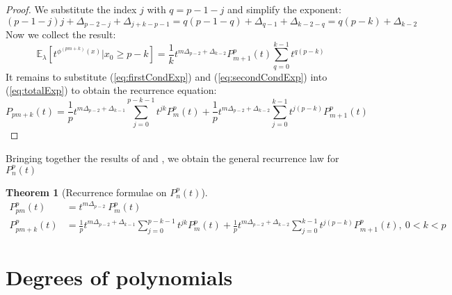 \documentclass[a4paper]{article}
\theoremstyle{plain}
\newtheorem{theorem}{Theorem}[section]
\theoremstyle{definition}
\begin{document}
\begin{proof}
We substitute the index $j$ with $q = p-1-j$ and simplify the exponent:
$$  (p-1-j) j + \Delta_{p-2-j} + \Delta_{j+k-p-1} =
    q(p-1-q) + \Delta_{q-1} + \Delta_{k-2-q}=
   q(p-k)+\Delta_{k-2} 
$$   
Now we collect the result: 
\begin{equation}\label{eq:secondCondExp}
\mathbb{E}_\lambda\left[ t^{\phi^{(pm+k)}(x)}| x_0 \ge p-k \right] 
 =  \frac{1}{k} t^{m\Delta_{p-2} + \Delta_{k-2}} P_{m+1}^p(t)
  \sum\limits_{q=0}^{k-1} t^{q(p-k)}
  \end{equation}
It remains to substitute (\ref{eq:firstCondExp}) and (\ref{eq:secondCondExp}) into (\ref{eq:totalExp}) to obtain the recurrence equation:
$$P_{pm+k}(t)  =   \frac{1}{p} t^{m\Delta_{p-2} + \Delta_{k-1}}\sum\limits_{j=0}^{p-k-1} t^{jk} P_m^p(t) 
      + \frac{1}{p} t^{m\Delta_{p-2} + \Delta_{k-2}}\sum\limits_{j=0}^{k-1} t^{j(p-k)} P_{m+1}^p(t) $$
\end{proof}
Bringing together the results of  and , we obtain the general recurrence law for $P_{n}^p(t)$
\begin{theorem}[Recurrence formulae on $P_{n}^p(t)$] 
\begin{align}
\label{P_pm} P_{pm}^p(t) & =  t^{m\Delta_{p-2}}\ P_m^p(t) \\
\label{P_pm+k} P_{pm+k}^p(t) & =  \frac{1}{p} t^{m\Delta_{p-2} + \Delta_{k-1}}\sum\limits_{j=0}^{p-k-1} t^{jk} P_m^p(t)  + \frac{1}{p} t^{m\Delta_{p-2} + \Delta_{k-2}}\sum\limits_{j=0}^{k-1} t^{j(p-k)} P_{m+1}^p(t), \ 0 < k < p
 \end{align}
\end{theorem}


\section{Degrees of polynomials}\label{degrees}
\end{document}
